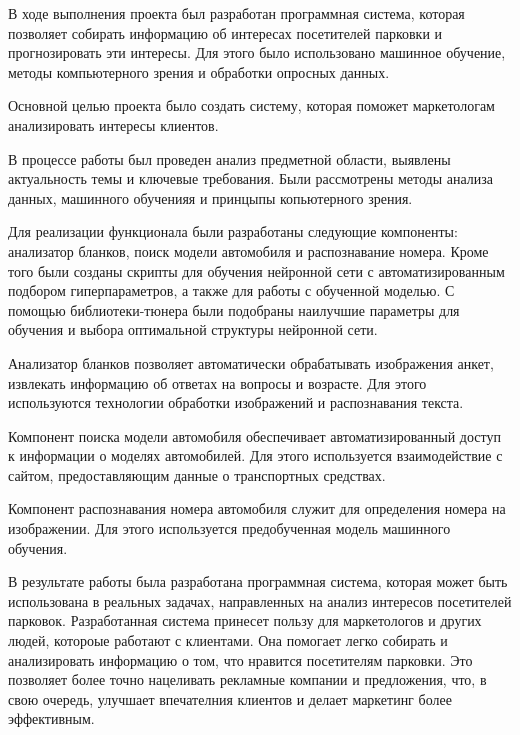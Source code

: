 \newpage


В ходе выполнения проекта был разработан программная система, которая позволяет собирать информацию об интересах посетителей парковки и прогнозировать эти интересы. Для этого было использовано машинное обучение, методы компьютерного зрения и обработки опросных данных. 

Основной целью проекта было создать систему, которая поможет маркетологам анализировать интересы клиентов.

В процессе работы был проведен анализ предметной области, выявлены актуальность темы и ключевые требования. Были рассмотрены методы анализа данных, машинного обученияя и принцыпы копьютерного зрения.

Для реализации функционала были разработаны следующие компоненты: анализатор бланков, поиск модели автомобиля и распознавание номера. Кроме того были созданы скрипты для обучения нейронной сети с автоматизированным подбором гиперпараметров, а также для работы с обученной моделью. С помощью библиотеки-тюнера были подобраны наилучшие параметры для обучения и выбора оптимальной структуры нейронной сети.

Анализатор бланков позволяет автоматически обрабатывать изображения анкет, извлекать информацию об ответах на вопросы и возрасте. Для этого используются технологии обработки изображений и распознавания текста.

Компонент поиска модели автомобиля обеспечивает автоматизированный доступ к информации о моделях автомобилей. Для этого используется взаимодействие с сайтом, предоставляющим данные о транспортных средствах.

Компонент распознавания номера автомобиля служит для определения номера на изображении. Для этого используется предобученная модель машинного обучения.

В результате работы была разработана программная система, которая может быть использована в реальных задачах, направленных на анализ интересов посетителей парковок. Разработанная система принесет пользу для маркетологов и 
других людей, котороые работают с клиентами. Она помогает легко собирать и анализировать информацию о том, что нравится посетителям парковки. Это позволяет более точно нацеливать 
рекламные компании и предложения, что, в свою очередь, улучшает впечателния клиентов и делает маркетинг более эффективным.